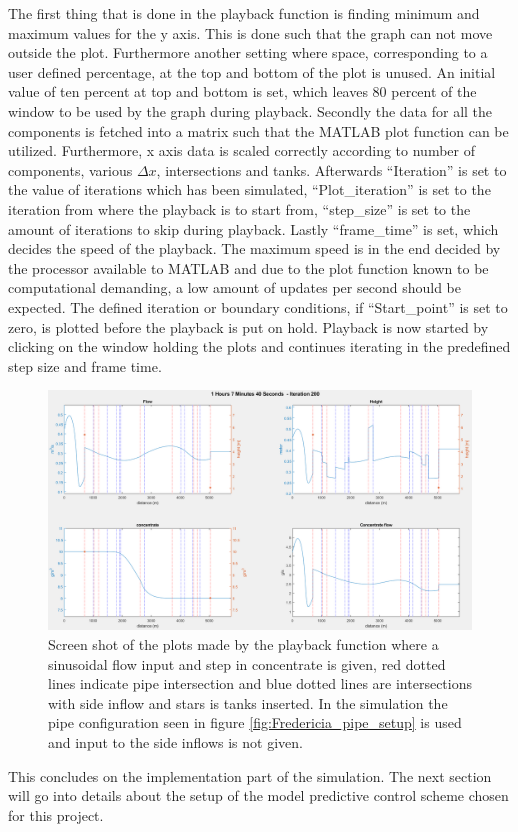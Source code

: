 The first thing that is done in the playback function is finding minimum and maximum values for the y axis. This is done such that the graph can not move outside the plot. Furthermore another setting where space, corresponding to a user defined percentage, at the top and bottom of the plot is unused. An initial value of ten percent at top and bottom is set, which leaves 80 percent of the window to be used by the graph during playback.  
Secondly the data for all the components is fetched into a matrix such that the MATLAB plot function can be utilized. Furthermore, x axis data is scaled correctly according to number of components, various $\Delta x$, intersections and tanks. Afterwards ``Iteration'' is set to the value of iterations which has been simulated, ``Plot\_iteration'' is set to the iteration from where the playback is to start from, ``step\_size'' is set to the amount of iterations to skip during playback. Lastly ``frame\_time'' is set, which decides the speed of the playback. The maximum speed is in the end decided by the processor available to MATLAB and due to the plot function known to be computational demanding, a low amount of updates per second should be expected. The defined iteration or boundary conditions, if ``Start\_point'' is set to zero, is plotted before the playback is put on hold. Playback is now started by clicking on the window holding the plots and continues iterating in the predefined step size and frame time.


 \begin{figure}
 \centering
 \includegraphics[width=1.0 \textwidth]{report/simulation/pictures/display_result_matlab.png}
 \caption{Screen shot of the plots made by the playback function where a sinusoidal flow input and step in concentrate is given, red dotted lines indicate pipe intersection and blue dotted lines are intersections with side inflow and stars is tanks inserted. In the simulation the pipe configuration seen in figure \ref{fig:Fredericia_pipe_setup} is used and input to the side inflows is not given.}
 \label{fig:display_result_matlab}
 \end{figure}

This concludes on the implementation part of the simulation. The next section will go into details about the setup of the model predictive control scheme chosen for this project.